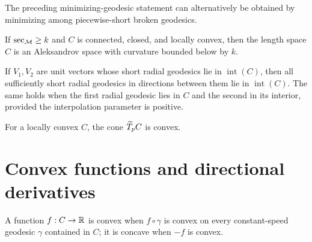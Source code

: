 \begin{remark}
\label{rem:chow-iii-h16-locally-convex-length-space}
The preceding minimizing-geodesic statement can alternatively be obtained by
minimizing among piecewise-short broken geodesics.
\end{remark}

\begin{proposition}
\label{prop:chow-iii-h17-aleksandrov-subset}

If $\sec_{\mathcal M}\ge k$ and $C$ is connected, closed, and locally convex, then the
length space $C$ is an Aleksandrov space with curvature bounded below by $k$.
\end{proposition}

\begin{lemma}
\label{lem:chow-iii-h18-infinitesimal-convexity}
If $V_1,V_2$ are unit vectors whose short radial geodesics lie in $\operatorname{int}(C)$,
then all sufficiently short radial geodesics in directions between them lie in
$\operatorname{int}(C)$.  The same holds when the first radial geodesic lies in $C$
and the second in its interior, provided the interpolation parameter is positive.
\end{lemma}

\begin{corollary}
\label{cor:chow-iii-h19-interior-tangent-cone-convex}

For a locally convex $C$, the cone $\widetilde T_pC$ is convex.
\end{corollary}

\section{Convex functions and directional derivatives}

\begin{definition}
\label{def:chow-iii-h20-convex-function}
A function $f:C\to\mathbb R$ is convex when $f\circ\gamma$ is convex on every constant-speed
geodesic $\gamma$ contained in $C$; it is concave when $-f$ is convex.
\end{definition}

